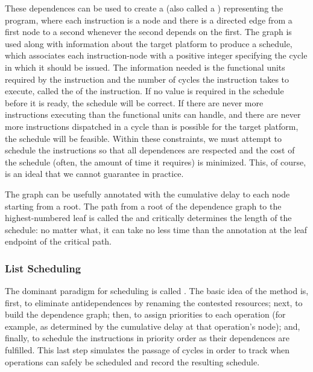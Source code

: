 
These dependences can be used to create a  (also called a ) representing the program, where each instruction is a node and there is a directed edge from a first node to a second whenever the second depends on the first. The graph is used along with information about the target platform to produce a schedule, which associates each instruction-node with a positive integer specifying the cycle in which it should be issued. The information needed is the functional units required by the instruction and the number of cycles the instruction takes to execute, called the  of the instruction. If no value is required in the schedule before it is ready, the schedule will be correct. If there are never more instructions executing than the functional units can handle, and there are never more instructions dispatched in a cycle than is possible for the target platform, the schedule will be feasible. Within these constraints, we must attempt to schedule the instructions so that all dependences are respected and the cost of the schedule (often, the amount of time it requires) is minimized. This, of course, is an ideal that we cannot guarantee in practice.

The graph can be usefully annotated with the cumulative delay to each node starting from a root. The path from a root of the dependence graph to the highest-numbered leaf is called the  and critically determines the length of the schedule: no matter what, it can take no less time than the annotation at the leaf endpoint of the critical path.


\subsubsection{List Scheduling}
The dominant paradigm for scheduling is called . The basic idea of the method is, first, to eliminate antidependences by renaming the contested resources; next, to build the dependence graph; then, to assign priorities to each operation (for example, as determined by the cumulative delay at that operation's node); and, finally, to schedule the instructions in priority order as their dependences are fulfilled. This last step simulates the passage of cycles in order to track when operations can safely be scheduled and record the resulting schedule.

